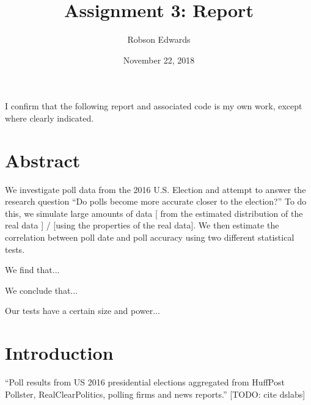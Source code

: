 \documentclass[11pt, oneside]{article}
\title{Assignment 3: Report}
\author{Robson Edwards}
\date{November 22, 2018}							%
\begin{document}
\maketitle

I confirm that the following report and associated code is my own work, except where clearly indicated.



\section*{Abstract}

We investigate poll data from the 2016 U.S. Election and attempt to answer the research question ``Do polls become more accurate closer to the election?'' To do this, we simulate large amounts of data [ from the estimated distribution of the real data ] / [using the properties of the real data]. 
We then estimate the correlation between poll date and poll accuracy using two different statistical tests. 

We find that... %

We conclude that... %

Our tests have a certain size and power... %

\section{Introduction}

``Poll results from US 2016 presidential elections aggregated from HuffPost Pollster, RealClearPolitics, polling firms and news reports.'' [TODO: cite dslabs]

\end{document}
